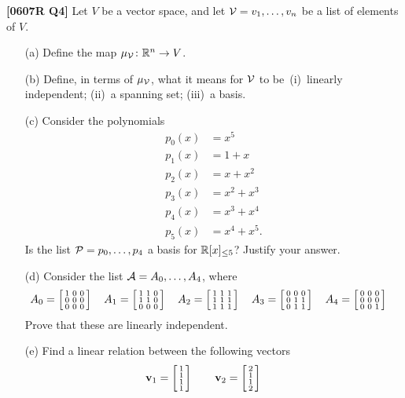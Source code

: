 \documentclass[a4paper]{article}
\begin{document}
\begin{problem}\textbf{[0607R Q4]}
 Let $V$ be a vector space, and let $\mathcal{V}=v_1,\dotsc,v_n$ be
 a list of elements of $V$.  
 \begin{itemize}
  \item[(a)] Define the map $\mu_{\mathcal{V}}\colon{\mathbb{R}}^n\to V$. 
  \item[(b)] Define, in terms of $\mu_{\mathcal{V}}$, what it means
   for $\mathcal{V}$ to be~(i)~linearly independent; (ii)~a spanning
   set; (iii)~a basis. 
  \item[(c)] Consider the polynomials 
   \begin{align*}
    p_0(x) &= x^5 \\
    p_1(x) &= 1+x \\
    p_2(x) &= x+x^2 \\
    p_3(x) &= x^2+x^3 \\
    p_4(x) &= x^3+x^4 \\
    p_5(x) &= x^4+x^5.
   \end{align*}
   Is the list $\mathcal{P}=p_0,\dotsc,p_4$ a basis for ${\mathbb{R}}[x]_{\leq 5}$?
   Justify your answer. 
  \item[(d)] Consider the list $\mathcal{A}=A_0,\dotsc,A_4$, where
   {\tiny \[
    A_0 = \left[\begin{smallmatrix} 1&0&0\\0&0&0\\0&0&0\end{smallmatrix}\right] \hspace{1em}
    A_1 = \left[\begin{smallmatrix} 1&1&0\\1&1&0\\0&0&0\end{smallmatrix}\right] \hspace{1em}
    A_2 = \left[\begin{smallmatrix} 1&1&1\\1&1&1\\1&1&1\end{smallmatrix}\right] \hspace{1em}
    A_3 = \left[\begin{smallmatrix} 0&0&0\\0&1&1\\0&1&1\end{smallmatrix}\right] \hspace{1em}
    A_4 = \left[\begin{smallmatrix} 0&0&0\\0&0&0\\0&0&1\end{smallmatrix}\right] \hspace{1em}
   \]}
   Prove that these are linearly independent. 
  \item[(e)] Find a linear relation between the following vectors  
   \[ \mathbf{v}_1 = \left[\begin{smallmatrix} 1\\ 1\\ 1\\ 1 \end{smallmatrix}\right] \hspace{2em}
      \mathbf{v}_2 = \left[\begin{smallmatrix} 2\\ 1\\ 1\\ 2 \end{smallmatrix}\right] \hspace{2em}
\]
\end{itemize}
\end{problem}
\end{document}
